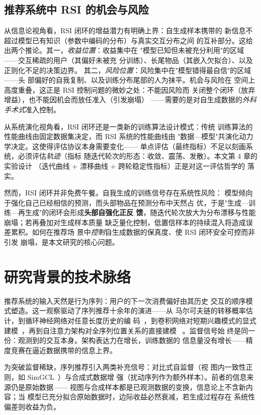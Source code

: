 \subsection{推荐系统中 RSI 的机会与风险}
从信息论视角看，RSI 闭环的增益潜力有明确上界：自生成样本携带的
新信息不超过模型已有知识（参数中编码的分布）与真实交互分布之间
的互补部分。这给出两个推论。其一，\emph{收益位置}：收益集中在
"模型已知但未被充分利用"的区域——交互稀疏的用户（其偏好未被充
分训练）、长尾物品（其嵌入欠拟合）、以及正则化不足的决策边界。
其二，\emph{风险位置}：风险集中在"模型错得最自信"的区域——头
部偏好的自我复制、以及训练分布尾部的人为抹平。机会与风险在
空间上高度重叠，这正是 RSI 控制问题的微妙之处：不能因风险而
关闭整个闭环（放弃增益），也不能因机会而放任准入（引发崩塌）
——需要的是对自生成数据的\emph{外科手术式}准入控制。

从系统演化视角看，RSI 闭环还是一类新的训练算法设计模式：传统
训练算法的性能曲线由固定数据集决定，而 RSI 系统的性能曲线由
"数据—模型"共演化动力学决定。这使得评估协议本身需要变化——
单点评估（最终指标）不足以刻画系统，必须评估\emph{轨迹}（指标
随迭代轮次的形态：收敛、震荡、发散）。本文第 4 章的实验设计
（迭代曲线 + 漂移曲线 + 跨轮稳定性指标）正是对这一评估哲学的
落实。

然而，RSI 闭环并非免费午餐。自我生成的训练信号存在系统性风险：
模型倾向于强化自己已经相信的预测，而头部物品在预测分布中天然占
优，于是"生成—训练—再生成"的闭环会形成\textbf{头部自强化正反
馈}，随迭代轮次放大为分布漂移与性能崩塌；若再叠加对生成样本质量
缺乏量化控制，低置信样本的持续混入将造成误差累积。如何在推荐场
景中\emph{控制}自生成数据的保真度、使 RSI 闭环安全可控而非引发
崩塌，是本文研究的核心问题。

\section{研究背景的技术脉络}
推荐系统的输入天然是行为序列：用户的下一次消费偏好由其历史
交互的顺序模式塑造。这一观察驱动了序列推荐十余年的演进——从
马尔可夫链的转移概率估计，到循环神经网络对任意长度历史的编
码~\cite{hidasi2016gru4rec}，到卷积网络对短期兴趣模式的显式建模~\cite%
{tang2018caser}，再到自注意力架构对全序列位置关系的直接建模
~\cite{kang2018sasrec,sun2019bert4rec}。监督信号始
终是同一份：观测到的交互本身。架构表达力在增长，训练数据的
信息量没有增长——精度竞赛在逼近数据携带的信息上界。

为突破监督稀缺，序列推荐引入两类补充信号：对比式自监督（视
图内一致性正则，如 SimGCL~\cite{yu2022simgcl}）与合成式数据增
强（扰动序列作为额外样本）。前者的信息来源仍是原始数据——
视图与合成样本都是已观测数据的变换，信息论上不含新内容；当
模型已充分拟合原始数据时，边际收益必然衰减，若生成过程存在
系统性偏差则收益为负。

